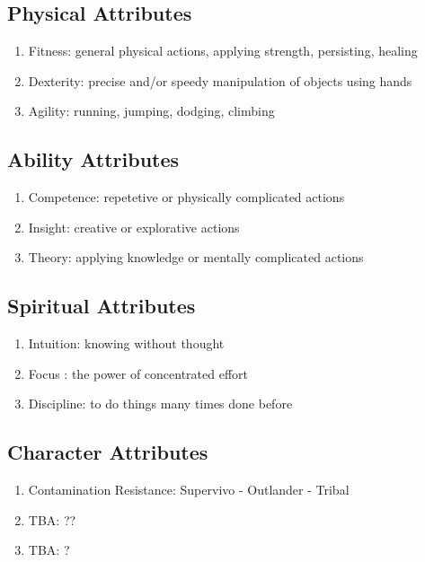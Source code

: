\subsection{Physical Attributes}\label{subsec:physical-attributes}
\begin{enumerate}[label= -]
    \item {Fitness}: general physical actions, applying strength, persisting, healing
    \item {Dexterity}: precise and/or speedy manipulation of objects using hands
    \item {Agility}: running, jumping, dodging, climbing
\end{enumerate}
\subsection{Ability Attributes}\label{subsec:ability-attributes}
\begin{enumerate}[label= -]
    \item {Competence}: repetetive or physically complicated actions
    \item {Insight}: creative or explorative actions
    \item {Theory}: applying knowledge or mentally complicated actions
\end{enumerate}
\subsection{Spiritual Attributes}\label{subsec:spiritual-attributes}
\begin{enumerate}[label= -]
    \item {Intuition}: knowing without thought
    \item {Focus} \label{itm:focus}: the power of concentrated effort
    \item {Discipline}: to do things many times done before
\end{enumerate}
\subsection{Character Attributes}\label{subsec:character-attributes}
\begin{enumerate}[label= -]
    \item {Contamination Resistance}: Supervivo - Outlander - Tribal
    \item {TBA}: ??
    \item {TBA}: ?
\end{enumerate}

